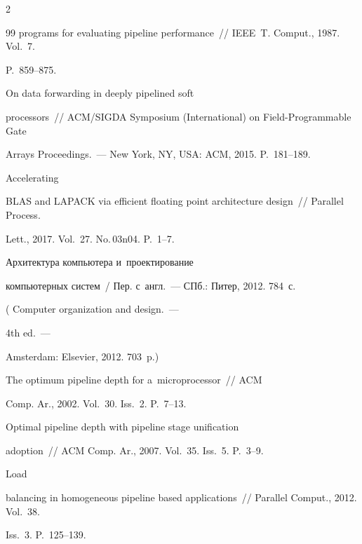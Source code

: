 \begin{multicols}{2}
{{\begin{thebibliography}{99}
programs for evaluating pipeline performance~// IEEE~T. Comput., 1987. Vol.~7. 


P.~859--875.




 On data forwarding in deeply pipelined soft 


processors~// ACM/SIGDA Symposium (International) on Field-Programmable Gate 


Arrays Proceedings.~--- New York, NY, USA: ACM, 2015. P.~181--189.






Accelerating 


BLAS and LAPACK via efficient floating point architecture design~// Parallel Process. 


Lett., 2017. Vol.~27. No.\,03n04. P.~1--7.




 Архитектура компьютера и~проектирование 


компьютерных систем~/ Пер. с~англ.~--- СПб.: Питер, 2012. 784~с. 


( Computer organization and design.~---


4th ed.~--- 


Amsterdam: Elsevier, 2012. 703~p.)




 The optimum pipeline depth for a~microprocessor~// ACM 


 Comp. Ar., 2002. Vol.~30. Iss.~2. P.~7--13. 




 Optimal pipeline depth with pipeline stage unification 


adoption~// ACM Comp. Ar., 2007. Vol.~35. Iss.~5. P.~3--9.




 Load 


balancing in homogeneous pipeline based applications~// Parallel Comput., 2012. Vol.~38. 


Iss.~3. P.~125--139.







\end{thebibliography}}}
\end{multicols}
